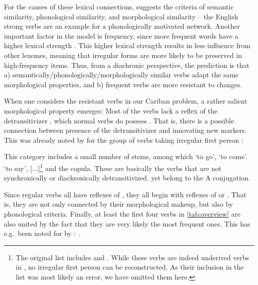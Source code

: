 For the causes of these lexical connections, \textcite[118]{bybee1985morphology} suggests the criteria of semantic similarity, phonological similarity, and morphological similarity -- the English strong verbs are an example for a phonologically motivated network.
Another important factor in the model is frequency, since more frequent words have a higher lexical strength \parencite[119]{bybee1985morphology}.
This higher lexical strength results in less influence from other lexemes, meaning that irregular forms are more likely to be preserved in high-frequency items.
Thus, from a diachronic perspective, the prediction is that a) semantically\slash{}phonologically\slash\hspace{0pt}morphologically similar verbs adapt the same morphological properties, and b) frequent verbs are more resistant to changes.

When one considers the resistant verbs in our Cariban problem, a rather salient morphological property emerges:
Most of the verbs lack a reflex of the detransitivizer \detrz, which normal  verbs do possess .
That is, there is a possible connection between presence of the detransitivizer and innovating new  markers.
This was already noted by \textcite{meira1998proto} for the group of \PTar verbs taking irregular first person :
\begin{quotebox}{\parencite[112]{meira1998proto}}
	This category includes a small number of stems, among which ‘to go’, ‘to come’. ‘to say’, [...]\footnote{The original list includes  and . While these verbs are indeed underived  verbs in \trio, no irregular first person  can be reconstructed. As their inclusion in the list was most likely an error, we have omitted them here.} and the copula. These are basically the verbs that are not synchronically or diachronically detransitivized. yet belong to the A conjugation.
\end{quotebox} %

Since regular  verbs all have reflexes of \detrz, they all begin with reflexes of  or .
That is, they are not only connected by their morphological makeup, but also by phonological criteria.
Finally, at least the first four verbs in \cref{tab:overview} are also united by the fact that they are very likely the most frequent ones.
This has e.g.\ been noted for \kalina by \textcite[75]{courtz2008carib}: .

